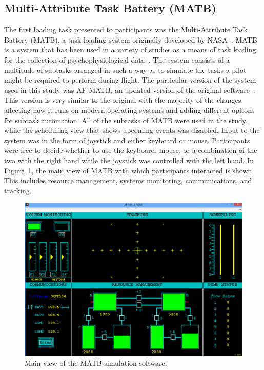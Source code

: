 \documentclass[11pt]{article}
\begin{document}
	\subsection{Multi-Attribute Task Battery (MATB)}
	The first loading task presented to participants was the Multi-Attribute Task Battery (MATB), a task loading system originally developed by NASA~\cite{Comstock}. MATB is a system that has been used in a variety of studies as a means of task loading for the collection of psychophysiological data~\cite{Wilson, Smith, Wang_Z}. The system consists of a multitude of subtasks arranged in such a way as to simulate the tasks a pilot might be required to perform during flight. The particular version of the system used in this study was AF-MATB, an updated version of the original software~\cite{Estepp}. This version is very similar to the original with the majority of the changes affecting how it runs on modern operating systems and adding different options for subtask automation. All of the subtasks of MATB were used in the study, while the scheduling view that shows upcoming events was disabled. Input to the system was in the form of joystick and either keyboard or mouse. Participants were free to decide whether to use the keyboard, mouse, or a combination of the two with the right hand while the joystick was controlled with the left hand. In Figure~\ref{fig:matb}, the main view of MATB with which participants interacted is shown. This includes resource management, systems monitoring, communications, and tracking. 
	
	\begin{figure}[]
	\centering
	\includegraphics[width=\linewidth]{figures/matb.png}
	\caption[Multi-Attribute Task Battery (MATB) Main View]{Main view of the MATB simulation software. }
	\label{fig:matb}
	\end{figure}
	
\end{document}
